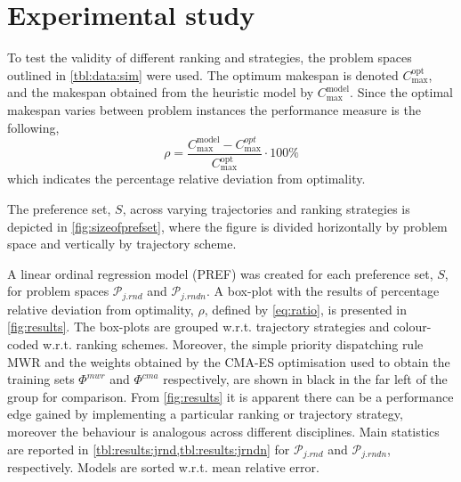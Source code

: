 \documentclass[smallextended]{llncs}
\begin{document}
\section{Experimental study}\label{sec:expr}
To test the validity of different ranking and strategies, the problem spaces outlined in \cref{tbl:data:sim} were used. The optimum makespan is denoted 
$C_{\max}^{\text{opt}}$, and the makespan obtained from the heuristic model by $C_{\max}^{\text{model}}$. Since 
the optimal makespan varies between problem instances the performance measure is the following, 
\begin{equation}\label{eq:ratio}\rho=\frac{C_{\max}^{\text{model}}-C_{\max}^{opt}}{C_{\max}^{\text{opt}}}\cdot 
100\%\end{equation}
which indicates the percentage relative deviation from optimality. 

The preference set, $S$, across varying trajectories and ranking strategies is depicted in \cref{fig:sizeofprefset}, where the figure is divided horizontally by problem space and vertically by trajectory scheme.
 
A linear ordinal regression model (PREF) was created for each preference set, $S$, for problem spaces $\mathcal{P}_{j.rnd}$ and $\mathcal{P}_{j.rndn}$. A box-plot with the results of percentage relative deviation from optimality, $\rho$, defined by \cref{eq:ratio}, is presented in \cref{fig:results}. The box-plots are grouped w.r.t. trajectory strategies and colour-coded w.r.t. ranking schemes. 
Moreover, the simple priority dispatching rule MWR and the weights obtained by the CMA-ES optimisation used to obtain the training sets $\Phi^{mwr}$ and $\Phi^{cma}$ respectively, are shown in black in the far left of the group for comparison.
From \cref{fig:results} it is apparent there can be a performance edge gained by implementing a particular ranking or trajectory strategy, moreover the behaviour is analogous across different disciplines. 
Main statistics are reported in \cref{tbl:results:jrnd,tbl:results:jrndn} for $\mathcal{P}_{j.rnd}$ and $\mathcal{P}_{j.rndn}$, respectively. Models are sorted w.r.t. mean relative error.
\end{document}
